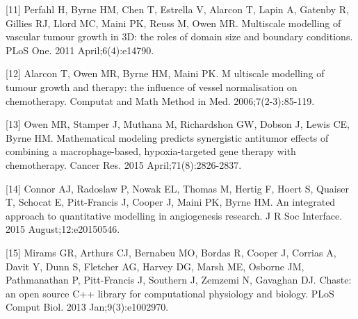 \documentclass[fullpage,11pt]{article}
\begin{document}
[11] Perfahl H, Byrne HM, Chen T, Estrella V, Alarcon T, Lapin A, Gatenby R, Gillies RJ, Llord MC, Maini PK, Reuss M, Owen MR. Multiscale modelling of vascular tumour growth in 3D: the roles of domain size and boundary conditions. PLoS One. 2011 April;6(4):e14790.

[12] Alarcon T, Owen MR, Byrne HM, Maini PK. M ultiscale modelling of tumour growth and therapy: the influence of vessel normalisation on chemotherapy. Computat and Math Method in Med. 2006;7(2-3):85-119.

[13] Owen MR, Stamper J, Muthana M, Richardshon GW, Dobson J, Lewis CE, Byrne HM. Mathematical modeling predicts synergistic antitumor effects of combining a macrophage-based, hypoxia-targeted gene therapy with chemotherapy. Cancer Res. 2015 April;71(8):2826-2837.

[14] Connor AJ, Radoslaw P, Nowak EL, Thomas M, Hertig F, Hoert S, Quaiser T, Schocat E, Pitt-Francis J, Cooper J, Maini PK, Byrne HM. An integrated approach to quantitative modelling in angiogenesis research. J R Soc Interface. 2015 August;12:e20150546.

[15] Mirams GR, Arthurs CJ, Bernabeu MO, Bordas R, Cooper J, Corrias A, Davit Y, Dunn S, Fletcher AG, Harvey DG, Marsh ME, Osborne JM, Pathmanathan P, Pitt-Francis J, Southern J, Zemzemi N, Gavaghan DJ. Chaste: an open source C++ library for computational physiology and biology. PLoS Comput Biol. 2013 Jan;9(3):e1002970.
\end{document}
